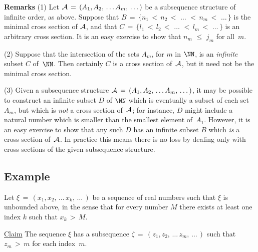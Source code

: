 \V

        {\bf Remarks} (1) Let ${\cal A} \,=\, (A_{1}, A_{2},\,{\ldots}\,A_{m},\,{\ldots}\,)$
    be a subsequence structure of infinite order, as above. Suppose that $B \,=\, \{n_{1}\,<\, n_{2}\,<\,\,{\ldots}\,\,<\,n_{m}\,<\,\,{\ldots}\,\}$
    is the minimal cross section of ${\cal A}$, and that $C \,=\, \{l_{1}\,<\, l_{2}\,<\,\,{\ldots}\,\,<\,l_{m}\,<\, \,{\ldots}\,\}$
    is an arbitrary cross section. It is an easy exercise to show that $n_{m}\,\,{\leq}\,\,j_{m}$ for all~$m$. %

\V

        (2) Suppose that the intersection of the sets $A_{m}$, for $m$ in ${\NN}$, is an {\em infinite} subset $C$ of~${\NN}$.
    Then certainly $C$ is a cross section of~${\cal A}$, but it need not be the minimal cross section.

\V

        (3) Given a subsequence structure ${\cal A} \,=\, (A_{1},A_{2},\,{\ldots}\,A_{m},\,{\ldots}\,)$,
    it may be possible to construct an infinite subset $D$ of ${\NN}$ which is eventually a subset of each set $A_{m}$,
    but which is {\em not} a cross section of~${\cal A}$; for instance, $D$ might include a natural number which is smaller than the smallest element of~$A_{1}$.
    However, it is an easy exercise to show that any such $D$ has an infinite subset $B$ which {\em is} a cross section of~${\cal A}$.
    In practice this means there is no loss by dealing only with cross sections of the given subsequence structure.

\VV

        \subsection{\small{{\bf Example}}} 
        \label{ExampA40.70}

\V


\hspace*{\parindent}
    Let ${\xi} \,=\, (x_{1}, x_{2},\,{\ldots}\,x_{k},\,{\ldots}\,)$ be a sequence of real numbers such that ${\xi}$ is unbounded above,
    in the sense that for every number $M$ there exists at least one index $k$ such that $x_{k}\,>\,M$.


\V
        \underline{Claim} The sequence ${\xi}$ has a subsequence ${\zeta} \,=\, (z_{1}, z_{2},\,{\ldots}\,z_{m}, \,{\ldots}\,)$
    such that $z_{m}\,>\,m$ for each index~$m$.

\V

